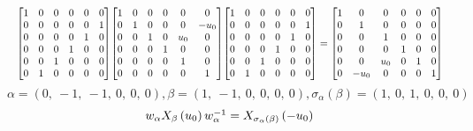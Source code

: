 \documentclass[11pt]{article}
\theoremstyle{definition}
\begin{document}
\[
\scaletoalign{\textwidth}{{\left[\begin{matrix}1 & 0 & 0 & 0 & 0 & 0\\0 & 0 & 0 & 0 & 0 & 1\\0 & 0 & 0 & 0 & 1 & 0\\0 & 0 & 0 & 1 & 0 & 0\\0 & 0 & 1 & 0 & 0 & 0\\0 & 1 & 0 & 0 & 0 & 0\end{matrix}\right]} {\left[\begin{matrix}1 & 0 & 0 & 0 & 0 & 0\\0 & 1 & 0 & 0 & 0 & - u_{0}\\0 & 0 & 1 & 0 & u_{0} & 0\\0 & 0 & 0 & 1 & 0 & 0\\0 & 0 & 0 & 0 & 1 & 0\\0 & 0 & 0 & 0 & 0 & 1\end{matrix}\right]} {\left[\begin{matrix}1 & 0 & 0 & 0 & 0 & 0\\0 & 0 & 0 & 0 & 0 & 1\\0 & 0 & 0 & 0 & 1 & 0\\0 & 0 & 0 & 1 & 0 & 0\\0 & 0 & 1 & 0 & 0 & 0\\0 & 1 & 0 & 0 & 0 & 0\end{matrix}\right]} = {\left[\begin{matrix}1 & 0 & 0 & 0 & 0 & 0\\0 & 1 & 0 & 0 & 0 & 0\\0 & 0 & 1 & 0 & 0 & 0\\0 & 0 & 0 & 1 & 0 & 0\\0 & 0 & u_{0} & 0 & 1 & 0\\0 & - u_{0} & 0 & 0 & 0 & 1\end{matrix}\right]}}
\]
\[
\alpha = \left( 0, \  -1, \  -1, \  0, \  0, \  0\right), \beta = \left( 1, \  -1, \  0, \  0, \  0, \  0\right), \sigma_{\alpha}(\beta) = \left( 1, \  0, \  1, \  0, \  0, \  0\right)
\]
\[
\scaletoalign{\textwidth}{w_{\alpha} X_{\beta}\left(u_{0}\right) w_{\alpha}^{-1} = X_{\sigma_{\alpha}\left(\beta\right)}\left(- u_{0}\right)}
\]
\end{document}
